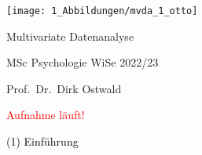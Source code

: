 \documentclass[
  8pt,
  ignorenonframetext,
]{beamer}
\author{}
\date{\vspace{-2.5em}}
\begin{document}
\begin{frame}[plain]{}
\protect\hypertarget{section}{}
\center

\begin{center}\texttt{[image: 1\_Abbildungen/mvda\_1\_otto]} \end{center}

\vspace{2mm}

\Huge

Multivariate Datenanalyse \vspace{6mm}

\Large

MSc Psychologie WiSe 2022/23

\vspace{6mm}
\large

Prof.~Dr.~Dirk Ostwald
\end{frame}

\begin{frame}[plain]{}
\protect\hypertarget{section-1}{}
\vfill
\center
\huge

\textcolor{red}{Aufnahme läuft!} \vfill
\end{frame}

\begin{frame}[plain]{}
\protect\hypertarget{section-2}{}
\vfill
\center
\huge

\textcolor{black}{(1) Einführung} \vfill
\end{frame}
\end{document}
